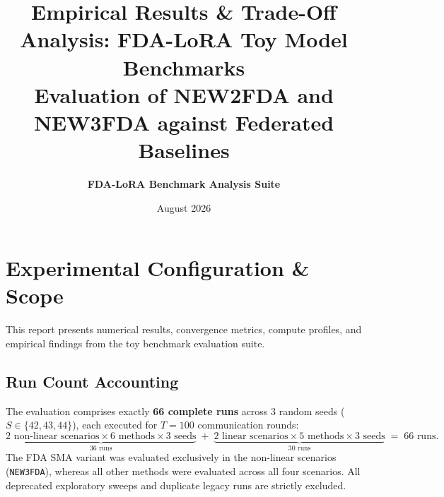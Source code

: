 \documentclass[10pt,a4paper]{article}
\title{\textbf{Empirical Results \& Trade-Off Analysis: FDA-LoRA Toy Model Benchmarks}\\[0.3em]\large Evaluation of NEW2FDA and NEW3FDA against Federated Baselines}
\author{\textbf{FDA-LoRA Benchmark Analysis Suite}}
\date{August 2026}
\begin{document}
\maketitle

\section{Experimental Configuration \& Scope}

This report presents numerical results, convergence metrics, compute profiles, and empirical findings from the toy benchmark evaluation suite.

\subsection{Run Count Accounting}
The evaluation comprises exactly \textbf{66 complete runs} across 3 random seeds ($S \in \{42, 43, 44\}$), each executed for $T=100$ communication rounds:
\begin{equation}
    \underbrace{2\text{ non-linear scenarios} \times 6\text{ methods} \times 3\text{ seeds}}_{36\text{ runs}} \;+\; \underbrace{2\text{ linear scenarios} \times 5\text{ methods} \times 3\text{ seeds}}_{30\text{ runs}} \;=\; 66\text{ runs}.
\end{equation}
The FDA SMA variant was evaluated exclusively in the non-linear scenarios (\texttt{NEW3FDA}), whereas all other methods were evaluated across all four scenarios. All deprecated exploratory sweeps and duplicate legacy runs are strictly excluded.
\end{document}
